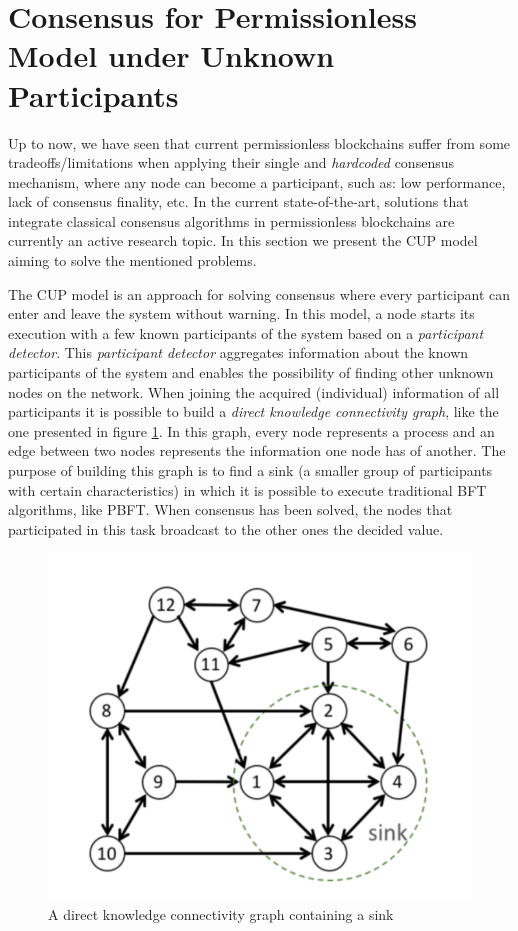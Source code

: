 \section{Consensus for Permissionless Model under Unknown Participants}
\label{sec:rel_work:cup}

Up to now, we have seen that current permissionless blockchains suffer from some tradeoffs/limitations when applying their single and \textit{hardcoded} consensus mechanism, where any node can become a participant, such as: low performance, lack of consensus finality, etc. In the current state-of-the-art, solutions that integrate classical consensus algorithms in permissionless blockchains are currently an active research topic. In this section we present the \gls{CUP} model \cite{cup_model} aiming to solve the mentioned problems.

The \gls{CUP} model \cite{cup_model} is an approach for solving consensus where every participant can enter and leave the system without warning. In this model, a node starts its execution with a few known participants of the system based on a \textit{participant detector}. This \textit{participant detector} aggregates information about the known participants of the system and enables the possibility of finding other unknown nodes on the network. When joining the acquired (individual) information of all participants it is possible to build a \textit{direct knowledge connectivity graph}, like the one presented in figure \ref{fig:sink}. In this graph, every node represents a process and an edge between two nodes represents the information one node has of another. The purpose of building this graph is to find a sink (a smaller group of participants with certain characteristics) in which it is possible to execute traditional \gls{BFT} algorithms, like \gls{PBFT}. When consensus has been solved, the nodes that participated in this task broadcast to the other ones the decided value.

\begin{figure}[h]
    \centering
    \includegraphics[scale=0.3]{Chapters/Figures/sink.png}
    \caption{A direct knowledge connectivity graph containing a sink}
    \label{fig:sink}
\end{figure}

